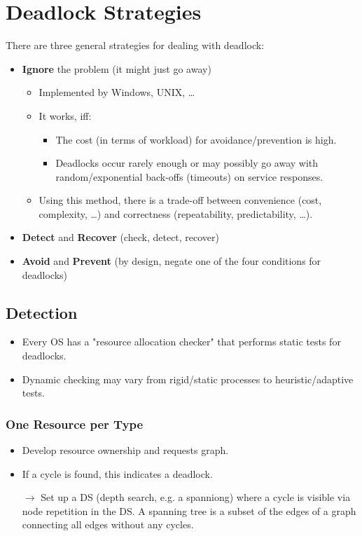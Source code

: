 	\section{Deadlock Strategies}
		There are three general strategies for dealing with deadlock:
		\begin{itemize}
			\item \textbf{Ignore} the problem (it might just go away)
				\begin{itemize}
					\item Implemented by Windows, UNIX, \dots
					\item It works, iff:
						\begin{itemize}
							\item The cost (in terms of workload) for avoidance/prevention is high.
							\item Deadlocks occur rarely enough or may possibly go away with random/exponential back-offs (timeouts) on service responses.
						\end{itemize}
					\item Using this method, there is a trade-off between convenience (cost, complexity, \dots) and correctness (repeatability, predictability, \dots).
				\end{itemize}
			\item \textbf{Detect} and \textbf{Recover} (check, detect, recover)
			\item \textbf{Avoid} and \textbf{Prevent} (by design, negate one of the four conditions for deadlocks)
		\end{itemize}

		\subsection{Detection}
			\begin{itemize}
				\item Every OS has a "resource allocation checker" that performs static tests for deadlocks.
				\item Dynamic checking may vary from rigid/static processes to heuristic/adaptive tests.
			\end{itemize}

			\subsubsection{One Resource per Type}
				\begin{itemize}
					\item Develop resource ownership and requests graph.
					\item If a cycle is found, this indicates a deadlock.
					\item[\(\rightarrow\)] Set up a DS (depth search, e.g. a spanniong) where a cycle is visible via node repetition in the DS. A spanning tree is a subset of the edges of a graph connecting all edges without any cycles.
				\end{itemize}

